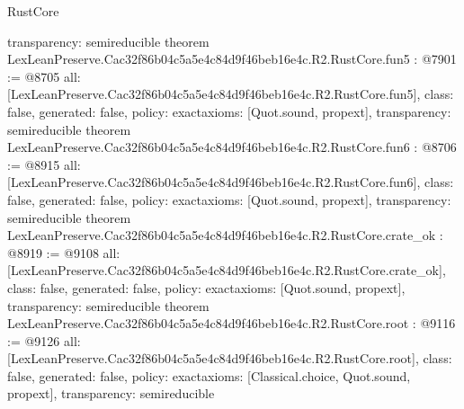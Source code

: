 \begin{lexlean}{RustCore}
\begin{coremodule}
{  transparency: semireducible
}
theorem LexLeanPreserve.Cac32f86b04c5a5e4c84d9f46beb16e4c.R2.RustCore.fun5 : @7901 := @8705 {
  all: [LexLeanPreserve.Cac32f86b04c5a5e4c84d9f46beb16e4c.R2.RustCore.fun5],
  class: false,
  generated: false,
  policy: exact{axioms: [Quot.sound, propext]},
  transparency: semireducible
}
theorem LexLeanPreserve.Cac32f86b04c5a5e4c84d9f46beb16e4c.R2.RustCore.fun6 : @8706 := @8915 {
  all: [LexLeanPreserve.Cac32f86b04c5a5e4c84d9f46beb16e4c.R2.RustCore.fun6],
  class: false,
  generated: false,
  policy: exact{axioms: [Quot.sound, propext]},
  transparency: semireducible
}
theorem LexLeanPreserve.Cac32f86b04c5a5e4c84d9f46beb16e4c.R2.RustCore.crate_ok : @8919 := @9108 {
  all: [LexLeanPreserve.Cac32f86b04c5a5e4c84d9f46beb16e4c.R2.RustCore.crate_ok],
  class: false,
  generated: false,
  policy: exact{axioms: [Quot.sound, propext]},
  transparency: semireducible
}
theorem LexLeanPreserve.Cac32f86b04c5a5e4c84d9f46beb16e4c.R2.RustCore.root : @9116 := @9126 {
  all: [LexLeanPreserve.Cac32f86b04c5a5e4c84d9f46beb16e4c.R2.RustCore.root],
  class: false,
  generated: false,
  policy: exact{axioms: [Classical.choice, Quot.sound, propext]},
  transparency: semireducible
}


\end{coremodule}
\end{lexlean}
